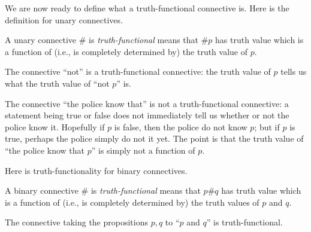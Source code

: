 We are now ready to define what a truth-functional connective is. Here is the definition for unary connectives.
\begin{definition}
	A unary connective $\#$ is \textit{truth-functional} means that $\#p$ has truth value which is a function of (i.e., is completely determined by) the truth value of $p$.
\end{definition}
\begin{example}
	The connective ``not'' is a truth-functional connective: the truth value of $p$ tells us what the truth value of ``not $p$'' is.
\end{example}
\begin{nex}
	The connective ``the police know that'' is not a truth-functional connective: a statement being true or false does not immediately tell us whether or not the police know it. Hopefully if $p$ is false, then the police do not know $p$; but if $p$ is true, perhaps the police simply do not it yet. The point is that the truth value of ``the police know that $p$'' is simply not a function of $p$.
\end{nex}
Here is truth-functionality for binary connectives.
\begin{definition}
	A binary connective $\#$ is \textit{truth-functional} means that $p\#q$ has truth value which is a function of (i.e., is completely determined by) the truth values of $p$ and $q$.
\end{definition}
\begin{example}
	The connective taking the propositions $p,q$ to ``$p$ and $q$'' is truth-functional.
\end{example}